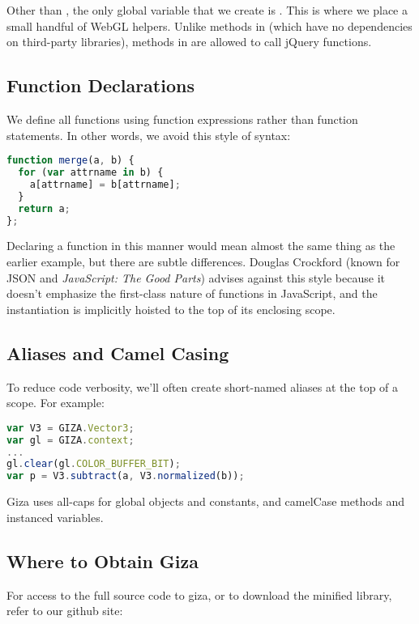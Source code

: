 Other than , the only global variable that we create is .  This is where we place a small handful of WebGL helpers.  Unlike methods in  (which have no dependencies on third-party libraries),  methods in  are allowed to call jQuery functions.

\subsection{Function Declarations}

We define all functions using function expressions rather than function statements.  In other words, we avoid this style of syntax:

\begin{lstlisting}[language=JavaScript]
function merge(a, b) {
  for (var attrname in b) {
    a[attrname] = b[attrname];
  }
  return a;
};
\end{lstlisting}

Declaring a function in this manner would mean almost the same thing as the earlier example, but there are subtle differences.  Douglas Crockford (known for JSON and \emph{JavaScript: The Good Parts}) advises against this style because it doesn't emphasize the first-class nature of functions in JavaScript, and the instantiation is implicitly hoisted to the top of its enclosing scope.

\subsection{Aliases and Camel Casing}

To reduce code verbosity, we'll often create short-named aliases at the top of a scope.  For example:

\begin{lstlisting}[language=JavaScript]
var V3 = GIZA.Vector3;
var gl = GIZA.context;
...
gl.clear(gl.COLOR_BUFFER_BIT);
var p = V3.subtract(a, V3.normalized(b));
\end{lstlisting}

Giza uses all-caps for global objects and constants, and camelCase methods and instanced variables.

\subsection{Where to Obtain Giza}

For access to the full source code to giza, or to download the minified library, refer to our github site:

